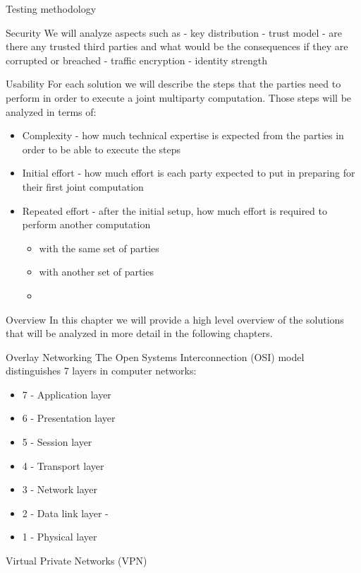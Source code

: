 \begin{frame}{Testing methodology}
\begin{block}{Security}
\protect\hypertarget{security}{}
We will analyze aspects such as - key distribution - trust model - are
there any trusted third parties and what would be the consequences if
they are corrupted or breached - traffic encryption - identity strength
\end{block}

\begin{block}{Usability}
\protect\hypertarget{usability}{}
For each solution we will describe the steps that the parties need to
perform in order to execute a joint multiparty computation. Those steps
will be analyzed in terms of:

\begin{itemize}
\tightlist
\item
  Complexity - how much technical expertise is expected from the parties
  in order to be able to execute the steps
\item
  Initial effort - how much effort is each party expected to put in
  preparing for their first joint computation
\item
  Repeated effort - after the initial setup, how much effort is required
  to perform another computation

  \begin{itemize}
  \tightlist
  \item
    with the same set of parties
  \item
    with another set of parties
  \item
  \end{itemize}
\end{itemize}
\end{block}
\end{frame}

\begin{frame}{Overview}
\protect\hypertarget{overview}{}
In this chapter we will provide a high level overview of the solutions
that will be analyzed in more detail in the following chapters.

\begin{block}{Overlay Networking}
\protect\hypertarget{overlay-networking}{}
The Open Systems Interconnection (OSI) model distinguishes 7 layers in
computer networks:

\begin{itemize}
\tightlist
\item
  7 - Application layer
\item
  6 - Presentation layer
\item
  5 - Session layer
\item
  4 - Transport layer
\item
  3 - Network layer
\item
  2 - Data link layer -
\item
  1 - Physical layer
\end{itemize}
\end{block}

\begin{block}{Virtual Private Networks (VPN)}
\protect\hypertarget{virtual-private-networks-vpn}{}
\end{block}
\end{frame}

